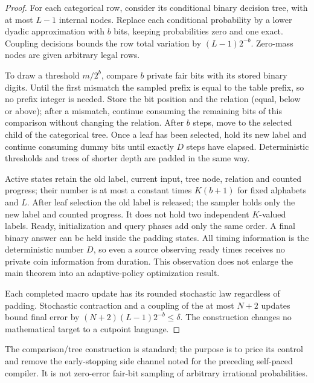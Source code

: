 \begin{proof}
For each categorical row, consider its conditional binary decision tree,
with at most $L-1$ internal nodes. Replace each conditional probability
by a lower dyadic approximation with $b$ bits, keeping probabilities zero
and one exact. Coupling decisions bounds the row total variation by
$(L-1)2^{-b}$. Zero-mass nodes are given arbitrary legal rows.

To draw a threshold $m/2^b$, compare $b$ private fair bits with its stored
binary digits. Until the first mismatch the sampled prefix is equal to
the table prefix, so no prefix integer is needed. Store the bit position
and the relation (equal, below or above); after a mismatch, continue
consuming the remaining bits of this comparison without changing the
relation. After $b$ steps, move to the selected child of the categorical
tree. Once a leaf has been selected, hold its new label and continue
consuming dummy bits until exactly $D$ steps have elapsed. Deterministic
thresholds and trees of shorter depth are padded in the same way.

Active states retain the old label, current input, tree node, relation
and counted progress; their number is at most a constant times $K(b+1)$
for fixed alphabets and $L$. After leaf selection the old label is
released; the sampler holds only the new label and counted progress.
It does not hold two independent $K$-valued labels. Ready, initialization
and query phases add only the same order. A final binary answer can be
held inside the padding states. All timing information is the deterministic
number $D$, so even a source observing ready times receives no private
coin information from duration. This observation does not enlarge the
main theorem into an adaptive-policy optimization result.

Each completed macro update has its rounded stochastic law regardless
of padding. Stochastic contraction and a coupling of the at most $N+2$
updates bound final error by $(N+2)(L-1)2^{-b}\le\delta$.
The construction changes no mathematical target to a cutpoint language.
\end{proof}

The comparison/tree construction is standard; the purpose is to price
its control and remove the early-stopping side channel noted for the
preceding self-paced compiler. It is not zero-error fair-bit sampling of
arbitrary irrational probabilities.


